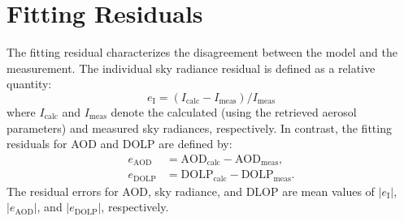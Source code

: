 \section{Fitting Residuals} \label{sec:invfit}

The fitting residual characterizes the disagreement between the model and the
measurement. The individual sky radiance residual is defined as a relative
quantity: 
\begin{equation}
e_\text{I}=(I_\text{calc}-I_\text{meas})/I_\text{meas}
\end{equation}
where $I_\text{calc}$ and $I_\text{meas}$ denote the calculated (using the 
retrieved aerosol parameters) and measured sky radiances, respectively. 
In contrast, the fitting residuals for AOD and DOLP are defined by: 
\begin{align}
e_\text{AOD} &= \text{AOD}_\text{calc}-\text{AOD}_\text{meas}, \\
e_\text{DOLP} &= \text{DOLP}_\text{calc}-\text{DOLP}_\text{meas}.
\end{align}
The residual errors for AOD, sky radiance, and DLOP are mean values of
$|e_\text{I}|$, $|e_\text{AOD}|$, and $|e_\text{DOLP}|$, respectively.


